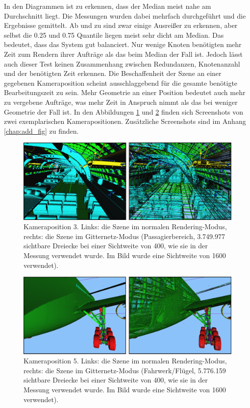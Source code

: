 In den Diagrammen ist zu erkennen, dass der Median meist nahe am Durchschnitt liegt. Die Messungen wurden dabei mehrfach durchgeführt und die Ergebnisse gemittelt. Ab und zu sind zwar einige Ausreißer zu erkennen, aber selbst die 0.25 und 0.75 Quantile liegen meist sehr dicht am Median. Das bedeutet, dass das System gut balanciert. Nur wenige Knoten benötigten mehr Zeit zum Rendern ihrer Aufträge als das beim Median der Fall ist. Jedoch lässt auch dieser Test keinen Zusammenhang zwischen Redundanzen, Knotenanzahl und der benötigten Zeit erkennen. Die Beschaffenheit der Szene an einer gegebenen Kameraposition scheint ausschlaggebend für die gesamte benötigte Bearbeitungszeit zu sein. Mehr Geometrie an einer Position bedeutet auch mehr zu vergebene Aufträge, was mehr Zeit in Anspruch nimmt als das bei weniger Geometrie der Fall ist. In den Abbildungen \ref{fig:eval:pos3} und \ref{fig:eval:pos5} finden sich Screenshots von zwei exemplarischen Kamerapositionen. Zusätzliche Screenshots sind im Anhang \ref{chap:add_fig} zu finden.
\begin{figure}
\centering
\includegraphics[width=\hsize]{images/pos3.pdf}
\caption[Kameraposition 3.]{\label{fig:eval:pos3}Kameraposition 3. Links: die Szene im normalen Rendering-Modus, rechts: die Szene im Gitternetz-Modus (Passagierbereich, 3.749.977 sichtbare Dreiecke bei einer Sichtweite von 400, wie sie in der Messung verwendet wurde. Im Bild wurde eine Sichtweite von 1600 verwendet).}
\end{figure}

\begin{figure}
\centering
\includegraphics[width=\hsize]{images/pos5.pdf}
\caption[Kameraposition 5.]{\label{fig:eval:pos5}Kameraposition 5. Links: die Szene im normalen Rendering-Modus, rechts: die Szene im Gitternetz-Modus (Fahrwerk/Flügel, 5.776.159 sichtbare Dreiecke bei einer Sichtweite von 400, wie sie in der Messung verwendet wurde. Im Bild wurde eine Sichtweite von 1600 verwendet).}
\end{figure}

